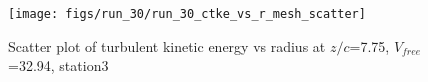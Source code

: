 \begin{figure}[H]
\centering
\texttt{[image: figs/run\_30/run\_30\_ctke\_vs\_r\_mesh\_scatter]}
\caption{Scatter plot of turbulent kinetic energy vs radius at $z/c$=7.75, $V_{free}$=32.94, station3}
\label{fig:run_30_ctke_vs_r_mesh_scatter}
\end{figure}


